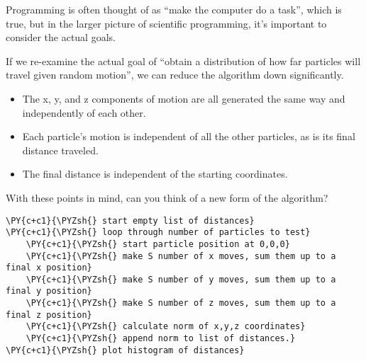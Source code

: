 Programming is often thought of as ``make the computer do a task'',
which is true, but in the larger picture of scientific programming, it's
important to consider the actual goals.

If we re-examine the actual goal of ``obtain a distribution of how far
particles will travel given random motion'', we can reduce the algorithm
down significantly.

\begin{itemize}
\tightlist
\item
  The x, y, and z components of motion are all generated the same way
  and independently of each other.
\item
  Each particle's motion is independent of all the other particles, as
  is its final distance traveled.
\item
  The final distance is independent of the starting coordinates.
\end{itemize}

With these points in mind, can you think of a new form of the algorithm?

    \begin{tcolorbox}[breakable, size=fbox, boxrule=1pt, pad at break*=1mm,colback=cellbackground, colframe=cellborder]
\begin{Verbatim}[commandchars=\\\{\}]
\PY{c+c1}{\PYZsh{} start empty list of distances}
\PY{c+c1}{\PYZsh{} loop through number of particles to test}
    \PY{c+c1}{\PYZsh{} start particle position at 0,0,0}
    \PY{c+c1}{\PYZsh{} make S number of x moves, sum them up to a final x position}
    \PY{c+c1}{\PYZsh{} make S number of y moves, sum them up to a final y position}
    \PY{c+c1}{\PYZsh{} make S number of z moves, sum them up to a final z position}
    \PY{c+c1}{\PYZsh{} calculate norm of x,y,z coordinates}
    \PY{c+c1}{\PYZsh{} append norm to list of distances.}
\PY{c+c1}{\PYZsh{} plot histogram of distances}
\end{Verbatim}
\end{tcolorbox}

